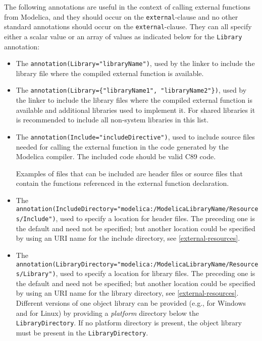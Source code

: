 The following annotations are useful in the context of calling external functions from Modelica, and they should occur on the {\lstinline!external!}-clause and no other standard annotations should occur on the {\lstinline!external!}-clause.
They can all specify either a scalar value or an array of values as indicated below for the {\lstinline!Library!} annotation:
\begin{itemize}
\item
  The {\lstinline!annotation(Library="libraryName")!}, used by the linker to include the library file where the compiled external function is available.
\item
  The {\lstinline!annotation(Library={"libraryName1", "libraryName2"})!}, used by the linker to include the library files where the compiled external function is available and additional libraries used to implement it.
  For shared libraries it is recommended to include all non-system libraries in this list.
\item
  The {\lstinline!annotation(Include="includeDirective")!}, used to include source files needed for calling the external function in the code generated by the Modelica compiler.
  The included code should be valid C89 code.
  \begin{nonnormative}
  Examples of files that can be included are header files or source files that contain the functions referenced in the external function declaration.
  \end{nonnormative}
\item
  The
  {\lstinline!annotation(IncludeDirectory="modelica:/ModelicaLibraryName/Resources/Include")!}, used to specify a location for header files.
  The preceding one is the default and need not be specified; but another location could be specified by using an URI name for the include directory, see \cref{external-resources}.
\item
  The
  {\lstinline!annotation(LibraryDirectory="modelica:/ModelicaLibraryName/Resources/Library")!}, used to specify a location for library files.
  The preceding one is the default and need not be specified; but another location could be specified by using an URI name for the library directory, see \cref{external-resources}.
  Different versions of one object library can be provided (e.g., for Windows and for Linux) by providing a \emph{platform} directory below the {\lstinline!LibraryDirectory!}.
  If no platform directory is present, the object library must be present in the {\lstinline!LibraryDirectory!}.

\end{itemize}
